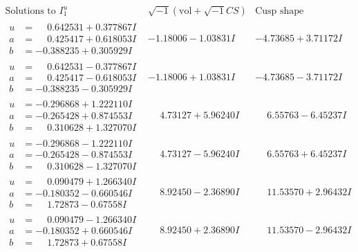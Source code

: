 \documentclass[1p]{elsarticle_modified}
\theoremstyle{definition}
\newcommand{\I}{\sqrt{-1}}
\begin{document}
$$\begin{array}{c|c|c}  
\text{Solutions to }I^u_{1}& \I (\text{vol} + \sqrt{-1}CS) & \text{Cusp shape}\\
 \hline 
\begin{aligned}
u &= \phantom{-}0.642531 + 0.377867 I \\
a &= \phantom{-}0.425417 + 0.618053 I \\
b &= -0.388235 + 0.305929 I\end{aligned}
 & -1.18006 - 1.03831 I & -4.73685 + 3.71172 I \\ \hline\begin{aligned}
u &= \phantom{-}0.642531 - 0.377867 I \\
a &= \phantom{-}0.425417 - 0.618053 I \\
b &= -0.388235 - 0.305929 I\end{aligned}
 & -1.18006 + 1.03831 I & -4.73685 - 3.71172 I \\ \hline\begin{aligned}
u &= -0.296868 + 1.222110 I \\
a &= -0.265428 + 0.874553 I \\
b &= \phantom{-}0.310628 + 1.327070 I\end{aligned}
 & \phantom{-}4.73127 + 5.96240 I & \phantom{-}6.55763 - 6.45237 I \\ \hline\begin{aligned}
u &= -0.296868 - 1.222110 I \\
a &= -0.265428 - 0.874553 I \\
b &= \phantom{-}0.310628 - 1.327070 I\end{aligned}
 & \phantom{-}4.73127 - 5.96240 I & \phantom{-}6.55763 + 6.45237 I \\ \hline\begin{aligned}
u &= \phantom{-}0.090479 + 1.266340 I \\
a &= -0.180352 - 0.660546 I \\
b &= \phantom{-}1.72873 - 0.67558 I\end{aligned}
 & \phantom{-}8.92450 - 2.36890 I & \phantom{-}11.53570 + 2.96432 I \\ \hline\begin{aligned}
u &= \phantom{-}0.090479 - 1.266340 I \\
a &= -0.180352 + 0.660546 I \\
b &= \phantom{-}1.72873 + 0.67558 I\end{aligned}
 & \phantom{-}8.92450 + 2.36890 I & \phantom{-}11.53570 - 2.96432 I \\ \hline\begin{aligned}

\end{aligned}
\end{array}$$
\end{document}

